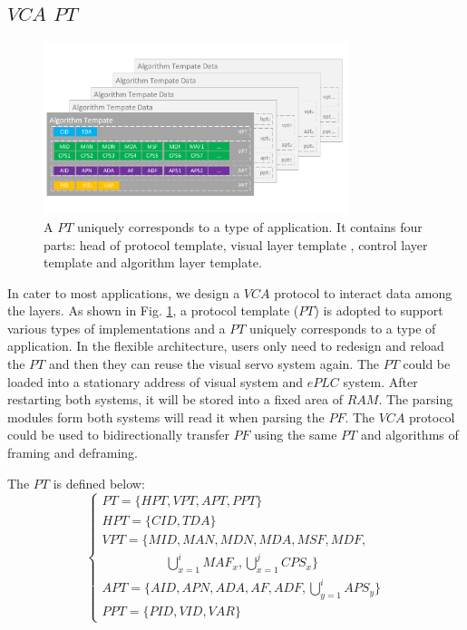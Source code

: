 \documentclass[journal,UTF8]{IEEEtran}
\begin{document}
\subsection{$VCA$ $PT$}
\begin{figure}
\centering
\includegraphics[width=3.5in]{fig/PT.pdf}
\caption{A $PT$ uniquely corresponds to a type of application. It contains four parts: head of protocol template, visual layer template , control layer template and algorithm layer template.}
\label{fig:PT}
\end{figure}
In cater to most applications, we design a $VCA$ protocol to interact data among the layers. As shown in Fig. \ref{fig:PT}, a protocol template ($PT$) is adopted to support various types of implementations and a $PT$ uniquely corresponds to a type of application. In the flexible architecture, users only need to redesign and reload the $PT$ and then they can reuse the visual servo system again. The $PT$ could be loaded into a stationary address of visual system and $ePLC$ system. After restarting both systems, it will be stored into a fixed area of $RAM$. The parsing modules form both systems will read it when parsing the $PF$. The $VCA$ protocol could be used to bidirectionally transfer $PF$ using the same $PT$ and algorithms of framing and deframing.  
 
 The $PT$ is defined below:
  \begin{equation}
 \left\{
 \begin{array}{l}
 PT = \{HPT, VPT, APT, PPT\}\\
 HPT = \{CID, TDA\}\\
 VPT = \{MID, MAN, MDN, MDA, MSF, MDF, \\
 \qquad\qquad\quad \bigcup_{x=1}^i MAF_x, \bigcup_{x=1}^j CPS_x\}\\
 APT = \{AID, APN, ADA, AF, ADF, \bigcup_{y=1}^i APS_y\}\\
 PPT = \{PID, VID, VAR\}
 \end{array}
 \right.
 \end{equation}
 
\end{document}
